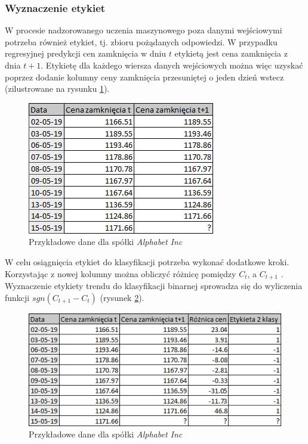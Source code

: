 \documentclass[a4paper, twoside, 11pt, openright]{article}
\begin{document}
\subsubsection{Wyznaczenie etykiet}

W procesie nadzorowanego uczenia maszynowego poza danymi wejściowymi potrzeba również etykiet, tj. zbioru pożądanych odpowiedzi. W przypadku regresyjnej predykcji cen zamknięcia w dniu $t$ etykietą jest cena zamknięcia z dnia $t+1$. Etykietę dla każdego wiersza danych wejściowych można więc uzyskać poprzez dodanie kolumny ceny zamknięcia przesuniętej o jeden dzień wstecz (zilustrowane na rysunku \ref{img:regression_label_creation}). 

\begin{figure}[H]
\centering 
\includegraphics[scale=0.9]{img/label_creation.png}
\caption{Przykładowe dane dla spółki \textit{Alphabet Inc}}
\label{img:regression_label_creation}
\end{figure}

W celu osiągnięcia etykiet do klasyfikacji potrzeba wykonać dodatkowe kroki. Korzystając z nowej kolumny można obliczyć różnicę pomiędzy $C_t$, a $C_{t+1}$ . Wyznaczenie etykiety trendu do klasyfikacji binarnej sprowadza się do wyliczenia funkcji $sgn(C_{t+1}-C_{t})$ (rysunek \ref{img:binary_label_creation}). 

\begin{figure}[H]
\centering 
\includegraphics[scale=0.9]{img/label_creation2.png}
\caption{Przykładowe dane dla spółki \textit{Alphabet Inc}}
\label{img:binary_label_creation}
\end{figure}
\end{document}

